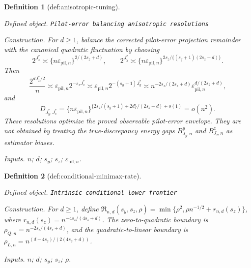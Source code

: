 \documentclass{article}
\newtheorem{definition}{Definition}
\begin{document}
\begin{definition}[def:anisotropic-tuning]\label{def:anisotropic-tuning}
\par\smallskip\noindent\emph{Defined object.} \texttt{Pilot-\allowbreak{}error balancing anisotropic resolutions}
\par\smallskip\noindent\emph{Construction.} For \(d\ge1\), balance the corrected pilot-error projection remainder with the canonical quadratic fluctuation by choosing
\[
2^{J_z^*}\asymp\{n\varepsilon_{\mathrm{pil},n}\}^{2/(2s_z+d)},
\qquad
2^{J_y^*}\asymp
\{n\varepsilon_{\mathrm{pil},n}\}^{2s_z/\{(s_y+1)(2s_z+d)\}}.
\]
Then
\[
\frac{2^{dJ_z^*/2}}n
\asymp
\varepsilon_{\mathrm{pil},n}2^{-s_zJ_z^*}
\asymp
\varepsilon_{\mathrm{pil},n}2^{-(s_y+1)J_y^*}
\asymp
n^{-2s_z/(2s_z+d)}
\varepsilon_{\mathrm{pil},n}^{d/(2s_z+d)},
\]
and
\[
D_{J_y^*,J_z^*}
=\{n\varepsilon_{\mathrm{pil},n}\}^{\{2s_z/(s_y+1)+2d\}/(2s_z+d)+o(1)}
=o(n^2).
\]
These resolutions optimize the proved observable pilot-error envelope.  They are not obtained by treating the true-discrepancy energy gaps \(B^y_{J_y,n}\) and \(B^z_{J_z,n}\) as estimator biases.
\par\smallskip\noindent\emph{Inputs.} \(n\); \(d\); \(s_y\); \(s_z\); \(\varepsilon_{\mathrm{pil},n}\).
\end{definition}

\begin{definition}[def:conditional-minimax-rate]\label{def:conditional-minimax-rate}
\par\smallskip\noindent\emph{Defined object.} \texttt{Intrinsic conditional lower frontier}
\par\smallskip\noindent\emph{Construction.} For \(d\ge1\), define \(\mathfrak R_{n,d}(s_y,s_z,\rho)=\min\{\rho^2,\rho n^{-1/2}+r_{n,d}(s_z)\}\), where \(r_{n,d}(s_z)=n^{-4s_z/(4s_z+d)}\). The zero-to-quadratic boundary is \(\rho_{Q,n}=n^{-2s_z/(4s_z+d)}\), and the quadratic-to-linear boundary is \(\rho_{L,n}=n^{(d-4s_z)/(2(4s_z+d))}\).
\par\smallskip\noindent\emph{Inputs.} \(n\); \(d\); \(s_y\); \(s_z\); \(\rho\).
\end{definition}
\end{document}
